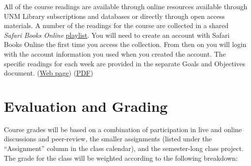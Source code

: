 \documentclass[
]{article}
\begin{document}
All of the course readings are available through online resources
available through UNM Library subscriptions and databases or directly
through open access materials. A number of the readings for the course
are collected in a shared \emph{Safari Books Online}
\href{https://learning.oreilly.com/playlists/96eb9098-8389-4d2a-959d-2064e0114b6b}{playlist}.
You will need to create an account with Safari Books Online the first
time you access the collection. From then on you will login with the
account information you used when you created the account. The specific
readings for each week are provided in the separate Goals and Objectives
document.
(\href{http://karlbenedict.com/OILS515/goalsAndObjectives/goalsAndObjectives.html}{Web
page}) \textbar{}
(\href{http://karlbenedict.com/OILS515/goalsAndObjectives/goalsAndObjectives.pdf}{PDF})

\hypertarget{evaluation-and-grading}{%
\section{Evaluation and Grading}\label{evaluation-and-grading}}

Course grades will be based on a combination of participation in live
and online discussions and peer-review, the smaller assignments (listed
under the ``Assignment'' column in the class calendar), and the
semester-long class project. The grade for the class will be weighted
according to the following breakdown:
\end{document}

